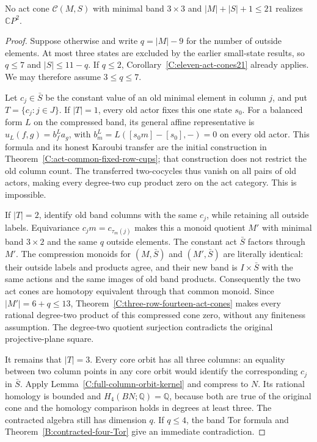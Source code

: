 \begin{theorem}
\label{C:three-by-three-act-cones21}
No act cone $\mathcal C(M,S)$ with minimal band $3\times3$
and $|M|+|S|+1\leq21$ realizes $\mathbb CP^2$.
\end{theorem}
\begin{proof}
Suppose otherwise and write $q=|M|-9$ for the number of
outside elements.  At most three states are excluded by the
earlier small-state results, so $q\leq7$ and $|S|\leq11-q$.
If $q\leq2$, Corollary~\ref{C:eleven-act-cones21} already
applies.  We may therefore assume $3\leq q\leq7$.

Let $c_j\in\bar S$ be the constant value of an old minimal
element in column $j$, and put $T=\{c_j:j\in J\}$.
If $|T|=1$, every old actor fixes this one state $s_0$.
For a balanced form $L$ on the compressed band, its general
affine representative is $u_L(f,g)=b^L_fa_g$, with
$b^L_m=L([s_0m]-[s_0],-)=0$ on every old actor.
This formula and its honest Karoubi transfer are the initial
construction in Theorem~\ref{C:act-common-fixed-row-cups};
that construction does not restrict the old column count.
The transferred two-cocycles thus
vanish on all pairs of old actors, making every degree-two
cup product zero on the act category.  This is impossible.

If $|T|=2$, identify old band columns with the same $c_j$,
while retaining all outside labels.  Equivariance
$c_jm=c_{\tau_m(j)}$ makes this a monoid quotient $M'$ with
minimal band $3\times2$ and the same $q$ outside elements.
The constant act $\bar S$ factors through $M'$.
The compression monoids for $(M,\bar S)$ and $(M',\bar S)$
are literally identical: their outside labels and products
agree, and their new band is $I\times\bar S$ with the same
actions and the same images of old band products.
Consequently the two act cones are homotopy equivalent through
that common monoid.  Since $|M'|=6+q\leq13$,
Theorem~\ref{C:three-row-fourteen-act-cones} makes every
rational degree-two product of this compressed cone zero,
without any finiteness assumption.  The degree-two quotient
surjection contradicts the original projective-plane square.

It remains that $|T|=3$.  Every core orbit has all three
columns: an equality between two column points in any core
orbit would identify the corresponding $c_j$ in $\bar S$.
Apply Lemma~\ref{C:full-column-orbit-kernel} and compress to
$N$.  Its rational homology is bounded and
$H_4(BN;\mathbb Q)=\mathbb Q$, because both are true of the
original cone and the homology comparison holds in degrees
at least three.  The contracted algebra still has dimension
$q$.  If $q\leq4$, the band Tor formula and
Theorem~\ref{B:contracted-four-Tor} give an immediate
contradiction.


\end{proof}
